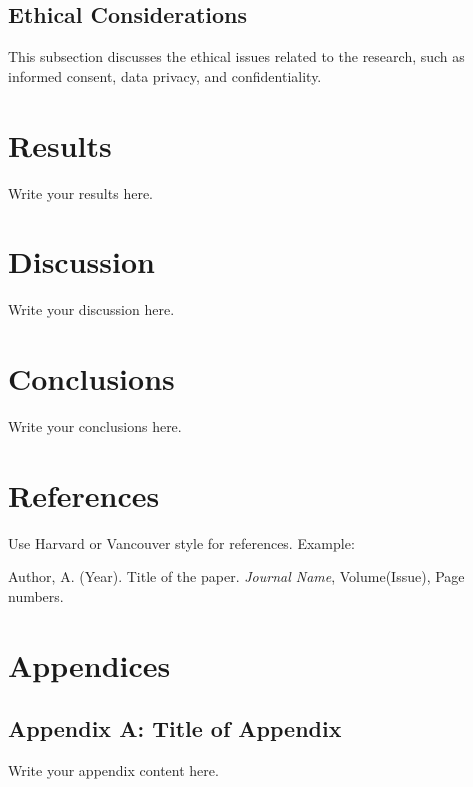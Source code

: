 \documentclass[12pt,a4paper]{article}
\begin{document}
\subsection{Ethical Considerations}
This subsection discusses the ethical issues related to the research, such as informed consent, data privacy, and confidentiality.

\section{Results}
Write your results here.

\section{Discussion}
Write your discussion here.

\section{Conclusions}
Write your conclusions here.

\newpage
\section*{References}
Use Harvard or Vancouver style for references. Example:
\begin{thebibliography}{9}
 Author, A. (Year). Title of the paper. \textit{Journal Name}, Volume(Issue), Page numbers.
\end{thebibliography}

\newpage
\section*{Appendices}
\subsection*{Appendix A: Title of Appendix}
Write your appendix content here.
\end{document}
